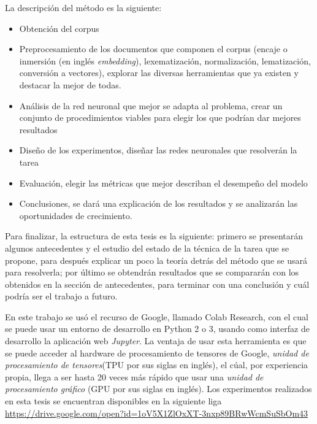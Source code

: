 \par La descripción del método es la siguiente:
\begin{itemize}
	\item Obtención del corpus
	\item Preprocesamiento de los documentos que componen el corpus (encaje o inmersión (en inglés \textit{embedding}), lexematización, normalización, lematización, conversión a vectores), explorar las diversas herramientas que ya existen y destacar la mejor de todas.
	\item Análisis de la red neuronal que mejor se adapta al problema, crear un conjunto de procedimientos viables para elegir los que podrían dar mejores resultados
	\item Diseño de los experimentos, diseñar las redes neuronales que resolverán la tarea
	\item Evaluación, elegir las métricas que mejor describan el desempeño del modelo
	\item Conclusiones, se dará una explicación de los resultados y se analizarán las oportunidades de crecimiento.
\end{itemize}

\par Para finalizar, la estructura de esta tesis es la siguiente: primero se presentarán algunos antecedentes y el estudio del estado de la técnica de la tarea que se propone, para después explicar un poco la teoría detrás del método que se usará para resolverla; por último se obtendrán resultados que se compararán con los obtenidos en la sección de antecedentes, para terminar con una conclusión y cuál podría ser el trabajo a futuro.

\par En este trabajo se usó el recurso de Google, llamado Colab Research, con el cual se puede usar un entorno de desarrollo en Python 2 o 3, usando como interfaz de desarrollo la aplicación web \textit{Jupyter}. La ventaja de usar esta herramienta es que se puede acceder al hardware de procesamiento de tensores de Google, \textit{unidad de procesamiento de tensores}(TPU por sus siglas en inglés), el cúal, por experiencia propia, llega a ser hasta 20 veces más rápido que usar una \textit{unidad de procesamiento gráfico} (GPU por sus siglas en inglés). Los experimentos realizados en esta tesis se encuentran disponibles en la siguiente liga \href{ https://drive.google.com/open?id=1oV5X1ZlOxXT-3nxp89BRwWcmSuSbOm43}{https://drive.google.com/open?id=1oV5X1ZlOxXT-3nxp89BRwWcmSuSbOm43}